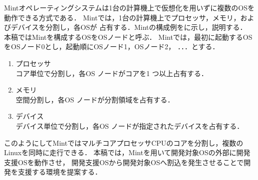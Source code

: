 \documentclass[submit,techreq,noauthor,dvipdfmx]{ipsj}
\begin{document}

Mintオペレーティングシステムは1台の計算機上で仮想化を用いずに複数のOSを動作できる方式である．
Mintでは，1台の計算機上でプロセッサ，メモリ，およびデバイスを分割し，各OSが
占有する．Mintの構成例をに示し，説明する．
本稿ではMintを構成するOSをOSノードと呼ぶ．
Mintでは，最初に起動するOSをOSノード0とし，起動順にOSノード1，OSノード2，
．．．とする．

\begin{enumerate}
    \item プロセッサ\\
        コア単位で分割し，各OS ノードがコアを1 つ以上占有する．
    \item メモリ\\
        空間分割し，各OS ノードが分割領域を占有する．
    \item デバイス\\
        デバイス単位で分割し，各OS ノードが指定されたデバイスを占有する．
\end{enumerate}

このようにしてMintではマルチコアプロセッサCPUのコアを分割し，複数のLinuxを同時に走行できる．
本稿では，Mintを用いて開発対象OSの外部に開発支援OSを動作させ，
開発支援OSから開発対象OSへ割込を発生させることで開発を支援する環境を提案する．

%
%
%
\end{document}
